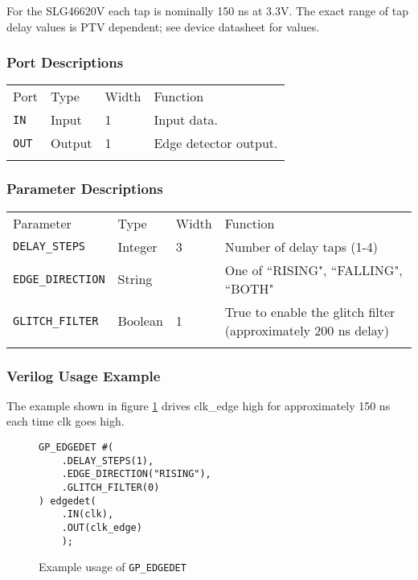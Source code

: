 \documentclass[11pt]{article}
\newcommand{\tokenstyle}[1]{\texttt{#1}}
\newcommand{\whenstyle}[1]{{\fontseries{sb}\selectfont#1}}
\newcommand{\thinhline}{\Xhline{1\arrayrulewidth}}
\newcommand{\thickhline}{\Xhline{2.5\arrayrulewidth}}
\begin{document}
For the SLG46620V each tap is nominally 150 ns at 3.3V. The exact range of tap delay values is PTV dependent; see
device datasheet for values.

\subsubsection{Port Descriptions}

\begin{tabularx}{\textwidth}{lllX}
\thinhline
\whenstyle{Port} & \whenstyle{Type} & \whenstyle{Width} & \whenstyle{Function} \\
\thickhline
\tokenstyle{IN} & Input & 1 & Input data. \\
\thinhline
\tokenstyle{OUT} & Output & 1 & Edge detector output. \\
\thinhline
\end{tabularx}

\subsubsection{Parameter Descriptions}

\begin{tabularx}{\textwidth}{lllX}
\thinhline
\whenstyle{Parameter} & \whenstyle{Type} & \whenstyle{Width} & \whenstyle{Function} \\
\thickhline
\tokenstyle{DELAY\_STEPS} & Integer & 3 & Number of delay taps (1-4) \\
\thinhline
\tokenstyle{EDGE\_DIRECTION} & String & & One of ``RISING", ``FALLING", ``BOTH" \\
\thinhline
\tokenstyle{GLITCH\_FILTER} & Boolean & 1 & True to enable the glitch filter (approximately 200 ns delay) \\
\thinhline
\end{tabularx}

\subsubsection{Verilog Usage Example}

The example shown in figure \ref{gp-edgedet-example} drives clk\_edge high for approximately 150 ns each time clk goes
high.

\begin{figure}[h]
\begin{lstlisting}
GP_EDGEDET #(
    .DELAY_STEPS(1),
    .EDGE_DIRECTION("RISING"),
    .GLITCH_FILTER(0)
) edgedet(
	.IN(clk),
	.OUT(clk_edge)
	);
\end{lstlisting}
\caption{Example usage of \tokenstyle{GP\_EDGEDET}}
\label{gp-edgedet-example}
\end{figure}
\end{document}
